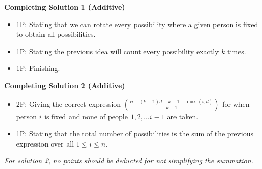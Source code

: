 {\textbf{Completing Solution 1 (Additive)}
\begin{itemize}
     \item 1P: Stating that we can rotate every possibility where a given person is fixed to obtain all possibilities.
     \item 1P: Stating the previous idea will count every possibility exactly $k$ times. 
     \item 1P: Finishing.
 \end{itemize}
 

 
 \textbf{Completing Solution 2 (Additive)}
\begin{itemize}
     \item 2P: Giving the correct expression $\binom{n-(k-1)d+k-1-\max(i,d)}{k-1}$ for when person $i$ is fixed and none of people $1, 2, \dots i-1$ are taken.
     \item 1P: Stating that the total number of possibilities is the sum of the previous expression over all $1 \le i \le n$.
 \end{itemize}
 \emph{For solution 2, no points should be deducted for not simplifying the summation.}
}

